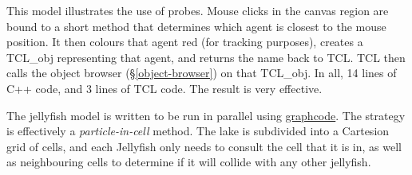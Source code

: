 This model illustrates the use of probes. Mouse clicks in the canvas
region are bound to a short method that determines which agent is
closest to the mouse position. It then colours that agent red (for
tracking purposes), creates a TCL\_obj representing that agent, and
returns the name back to TCL. TCL then calls the object browser
(\S\ref{object-browser}) on that TCL\_obj. In all, 14 lines of C++
code, and 3 lines of TCL code. The result is very effective.

The jellyfish model is written to be run in parallel using
\hyperref{Graphcode}{Graphcode
  (\S}{)}{graphcode}. The strategy is effectively a
{\em particle-in-cell} method. The lake is subdivided into a Cartesion
grid of cells, and each Jellyfish only needs to consult the cell that
it is in, as well as neighbouring cells to determine if it will
collide with any other jellyfish.

